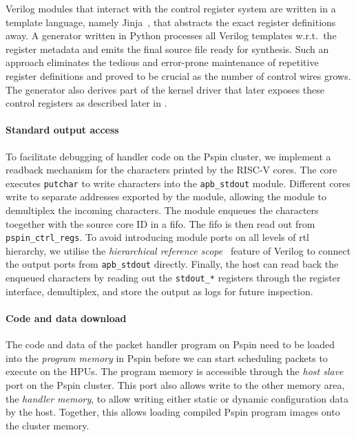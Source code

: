 Verilog modules that interact with the control register system are written in a template language, namely Jinja~\cite{noauthor_jinja_nodate}, that abstracts the exact register definitions away.  A generator written in Python processes all Verilog templates w.r.t.\ the register metadata and emits the final source file ready for synthesis.  Such an approach eliminates the tedious and error-prone maintenance of repetitive register definitions and proved to be crucial as the number of control wires grows.  The generator also derives part of the kernel driver that later exposes these control registers as described later in .

\paragraph{Standard output access} To facilitate debugging of handler code on the P\acs{spin} cluster, we implement a readback mechanism for the characters printed by the RISC-V cores.  The core executes \texttt{putchar} to write characters into the \texttt{apb\_stdout} module.  Different cores write to separate addresses exported by the module, allowing the module to demultiplex the incoming characters.  The module enqueues the characters toegether with the source core ID in a \ac{fifo}.  The \ac{fifo} is then read out from \texttt{pspin\_ctrl\_regs}.  To avoid introducing module ports on all levels of \ac{rtl} hierarchy, we utilise the \emph{hierarchical reference scope}~\cite{noauthor_verilog_nodate} feature of Verilog to connect the output ports from \texttt{apb\_stdout} directly.  Finally, the host can read back the enqueued characters by reading out the \texttt{stdout\_*} registers through the register interface, demultiplex, and store the output as logs for future inspection.

\paragraph{Code and data download} The code and data of the packet handler program on P\acs{spin} need to be loaded into the \emph{program memory} in P\acs{spin} before we can start scheduling packets to execute on the HPUs.  The program memory is accessible through the \emph{host slave} port on the P\acs{spin} cluster.  This port also allows write to the other memory area, the \emph{handler memory}, to allow writing either static or dynamic configuration data by the host.  Together, this allows loading compiled P\acs{spin} program images onto the cluster memory.

